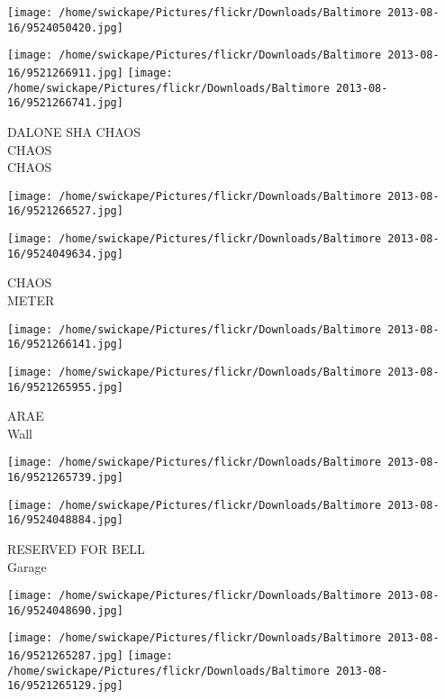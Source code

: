 \documentclass[10pt,letterpaper]{article}
\begin{document}
\texttt{[image: /home/swickape/Pictures/flickr/Downloads/Baltimore 2013-08-16/9524050420.jpg]}

\vspace{0.25in}
\texttt{[image: /home/swickape/Pictures/flickr/Downloads/Baltimore 2013-08-16/9521266911.jpg]}
\texttt{[image: /home/swickape/Pictures/flickr/Downloads/Baltimore 2013-08-16/9521266741.jpg]}

DALONE SHA CHAOS\\
CHAOS\\
CHAOS\\
\pagebreak

\texttt{[image: /home/swickape/Pictures/flickr/Downloads/Baltimore 2013-08-16/9521266527.jpg]}

\vspace{0.25in}
\texttt{[image: /home/swickape/Pictures/flickr/Downloads/Baltimore 2013-08-16/9524049634.jpg]}

CHAOS\\
METER\\
\pagebreak

\texttt{[image: /home/swickape/Pictures/flickr/Downloads/Baltimore 2013-08-16/9521266141.jpg]}

\vspace{0.25in}
\texttt{[image: /home/swickape/Pictures/flickr/Downloads/Baltimore 2013-08-16/9521265955.jpg]}

ARAE\\
Wall\\
\pagebreak

\texttt{[image: /home/swickape/Pictures/flickr/Downloads/Baltimore 2013-08-16/9521265739.jpg]}

\vspace{0.25in}
\texttt{[image: /home/swickape/Pictures/flickr/Downloads/Baltimore 2013-08-16/9524048884.jpg]}

RESERVED FOR BELL\\
Garage\\
\pagebreak

\texttt{[image: /home/swickape/Pictures/flickr/Downloads/Baltimore 2013-08-16/9524048690.jpg]}

\vspace{0.25in}
\texttt{[image: /home/swickape/Pictures/flickr/Downloads/Baltimore 2013-08-16/9521265287.jpg]}
\texttt{[image: /home/swickape/Pictures/flickr/Downloads/Baltimore 2013-08-16/9521265129.jpg]}
\end{document}
